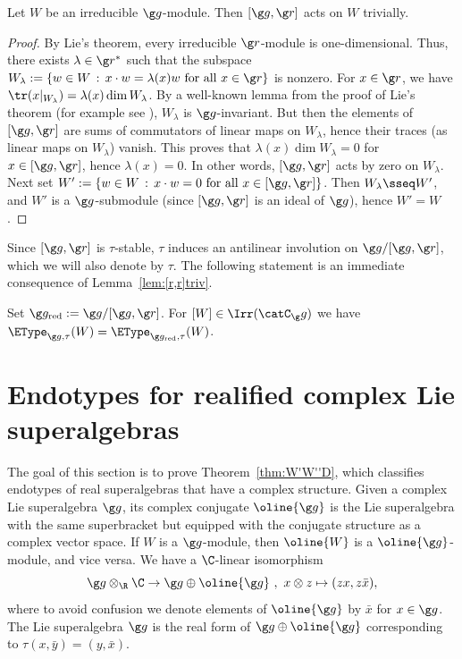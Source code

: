 \documentclass[12pt]{amsart}
\begin{document}
\begin{lem}
\label{lem:[r,r]triv}
Let $W$ be an irreducible $\g g$-module. Then $[\g g,\g r]$ acts on $W$ trivially.   
\end{lem}
\begin{proof}
 By Lie's theorem, every irreducible $\g r$-module is one-dimensional. Thus, there exists $\lambda\in\g r^*$ such that the subspace $
W_\lambda:=\{w\in W\,:\,x\cdot w=\lambda(x)w\text{ for all }x\in\g r\}$
 is nonzero. For $x\in\g r$, we have $\tr(x|_{W_\lambda})=\lambda(x)\dim W_\lambda$. By a  well-known lemma from the proof of Lie's theorem (for example see \cite[Lemma 9.13]{FultonHarris1991}), $W_\lambda$ is $\g g$-invariant. But then the elements of $[\g g,\g r]$ are sums of commutators of linear maps on $W_\lambda$, hence their traces (as linear maps on $W_\lambda$) vanish. This proves that $\lambda(x)\dim W_\lambda=0$ for $x\in[\g g,\g r]$, hence $\lambda(x)=0$. In other words, $[\g g,\g r]$ acts by zero on $W_\lambda$. Next set $W':=\{w\in W\,:\,x\cdot w=0\text{ for all }x\in [\g g,\g r]\}$. Then $W_\lambda\sseq W'$, and $W'$ is a $\g g$-submodule (since $[\g g,\g r]$ is an ideal of $\g g$), hence $W'=W$.     
\end{proof}
Since $[\g g,\g r]$ is $\tau$-stable, $\tau$ induces an antilinear involution on $\g g/[\g g,\g r]$, which we will also denote by $\tau$. The following statement is an immediate consequence of Lemma~\ref{lem:[r,r]triv}. 
\begin{thm}
Set $\g g_\mathrm{red}:=\g g/[\g g,\g r]$. For $[W]\in\Irr(\catC_\g g)$ we have $\EType_{\g g,\tau}(W)=\EType_{\g g_\mathrm{red},\tau}(W)$. 
\end{thm}



\section{Endotypes for realified complex Lie superalgebras}
\label{sec:realified}

The goal of this section is to prove Theorem~\ref{thm:W'W''D}, which classifies endotypes of real superalgebras that have a complex structure. Given a complex Lie superalgebra $\g g$,  
its complex conjugate $\oline{\g g}$  is the Lie superalgebra with the same superbracket but equipped with the conjugate structure as a complex vector space.  If $W$ is a $\g g$-module, then $\oline{W}$ is a $\oline{\g g}$-module, and vice versa.  
We have a $\C$-linear isomorphism
\[
\g g\otimes_\R\C\to \g g\oplus \oline{\g g}\ ,\ 
x\otimes z\mapsto (zx,z \bar x),
\]
where to avoid confusion we denote elements of $\oline{\g g}$ by $\bar x$ for $x\in\g g$. 
The Lie superalgebra $\g g$ is the real form of $\g g\oplus\oline{\g g}$ corresponding to $\tau(x,\bar y)=(y,\bar x)$.
\end{document}
